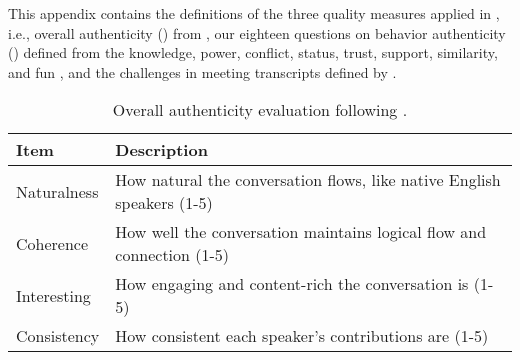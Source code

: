 This appendix contains the definitions of the three quality measures applied in , i.e., overall authenticity () from \citet{ChenPTK23}, our eighteen questions on behavior authenticity () defined from the knowledge, power, conflict, status, trust, support, similarity, and fun \cite{ChoiAVQ20,bales2009interaction}, and the challenges in meeting transcripts defined by \citet{KirsteinWRG24a}.


\begin{table}[ht]
  \centering
  \scriptsize
  \begin{tabularx}{\linewidth}{lX}
    \toprule
    \rowcolor{gray!20}
    \textbf{Item} & \textbf{Description} \\
    \midrule
    Naturalness & How natural the conversation flows, like native English speakers (1-5) \\
    Coherence   & How well the conversation maintains logical flow and connection (1-5) \\
    Interesting & How engaging and content-rich the conversation is (1-5) \\
    Consistency & How consistent each speaker's contributions are (1-5) \\
    \bottomrule
  \end{tabularx}
  \caption{Overall authenticity evaluation following .}
  \label{tab:appendix_authenticity_questions}
\end{table}



